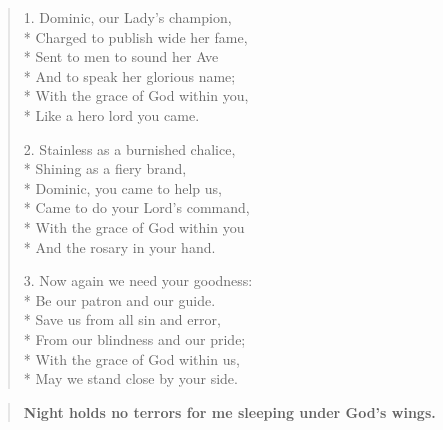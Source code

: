 \documentclass[letterpaper,12pt]{extarticle}
\newcommand{\side}[1]{\flagverse{\textcolor{red}{\textit{#1}}:}}
\newlength{\oldindent}
\newcommand{\antiphon}[2]{
	\setlength{\oldindent}{\vindent}
	\setlength{\vindent}{0em}
	\begin{verse}
	\side{#1} \textbf{#2}
	\end{verse}
	\setlength{\vindent}{\oldindent}
}
\begin{document}
\begin{verse}
	1. Dominic, our Lady's champion, \\*
Charged to publish wide her fame, \\*
Sent to men to sound her Ave \\*
And to speak her glorious name; \\*
With the grace of God within you, \\*
Like a hero lord you came.

2. Stainless as a burnished chalice, \\*
Shining as a fiery brand, \\*
Dominic, you came to help us, \\*
Came to do your Lord's command, \\*
With the grace of God within you \\*
And the rosary in your hand.

3. Now again we need your goodness: \\*
Be our patron and our guide. \\*
Save us from all sin and error, \\*
From our blindness and our pride; \\*
With the grace of God within us, \\*
May we stand close by your side.

\end{verse}
{}
\vspace{-1.5\baselineskip}
\antiphon{Leader 1}{Night holds no terrors for me sleeping under God's wings.}
\vspace{-1.0\baselineskip}
\end{document}

